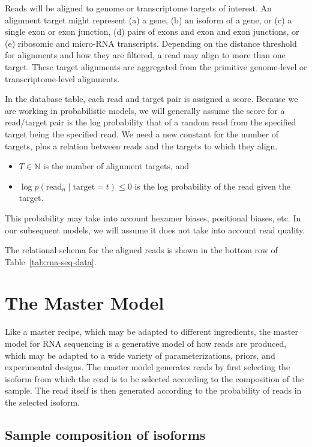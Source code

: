 \documentclass[11pt]{report}
\begin{document}
Reads will be aligned to genome or transcriptome targets of interest.
An alignment target might represent (a) a gene, (b) an isoform of a
gene, or (c) a single exon or exon junction, (d) pairs of exons and
exon and exon junctions, or (e) ribosomic and micro-RNA transcripts.
Depending on the distance threshold for alignments and how they are
filtered, a read may align to more than one target. These target
alignments are aggregated from the primitive genome-level or
transcriptome-level alignments.

In the database table, each read and target pair is assigned a score.
Because we are working in probabilistic models, we will generally
assume the score for a read/target pair is the log probability that
of a random read from the specified target being the specified read.
We need a new constant for the number of targets, plus a relation
between reads and the targets to which they align.
%
\begin{itemize}
\item $T \in \mathbb{N}$ is the number of alignment targets, and
\item $\log p(\textrm{read}_n \mid \textrm{target} = t) \leq 0$
  is the log probability of the read given the target.
\end{itemize}
This probability may take into account hexamer biases, positional
biases, etc.  In our subsequent models, we will assume it does not
take into account read quality.  

The relational schema for the aligned reads is shown in the bottom row
of Table~\ref{tab:rna-seq-data}.


\chapter{The Master Model}

Like a master recipe, which may be adapted to different ingredients,
the master model for RNA sequencing is a generative model of how reads
are produced, which may be adapted to a wide variety of
parameterizations, priors, and experimental designs.  The master model
generates reads by first selecting the isoform from which the read is
to be selected according to the composition of the sample.  The read
itself is then generated according to the probability of reads in the
selected isoform.

\section{Sample composition of isoforms}
\end{document}
